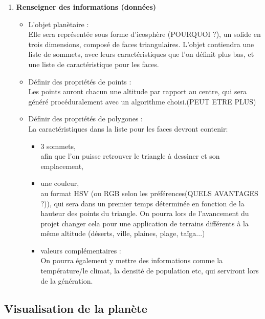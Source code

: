 \documentclass[a4paper]{article}
\begin{document}
\begin{enumerate}
\begin{itemize}
        \end{itemize}
            
        \item \textbf{Renseigner des informations (données)}
            \begin{itemize}
                \item {L'objet planètaire :}\\
                Elle sera représentée sous forme d'icosphère (POURQUOI ?), un solide en trois dimensions, composé de faces triangulaires. 
                L'objet contiendra une liste de sommets, avec leurs caractéristiques que l'on définit plus bas, et une liste de caractéristique pour les faces.
                \item {Définir des propriétés de points :}\\
                Les points auront chacun une altitude par rapport au centre, qui sera généré procéduralement avec un algorithme choisi.(PEUT ETRE PLUS)
                \item {Définir des propriétés de polygones :}\\
                La caractéristiques dans la liste pour les faces devront contenir:
                    \begin{itemize}
                        \item {3 sommets,}\\
                        afin que l'on puisse retrouver le triangle à dessiner et son emplacement,
                        \item {une couleur,}\\
                        au format HSV (ou RGB selon les préférences(QUELS AVANTAGES ?)), qui sera dans un premier temps déterminée en fonction de la hauteur des points du triangle. 
                        On pourra lors de l'avancement du projet changer cela pour une application de terrains différents à la même altitude (déserts, ville, plaines, plage, taïga...)
                        \item {valeurs complémentaires :}\\
                        On pourra également y mettre des informations comme la température/le climat, la densité de population etc, qui serviront lors de la génération.
                \end{itemize}
        \end{itemize}
\end{enumerate}

\subsection{Visualisation de la planète}
\end{document}
